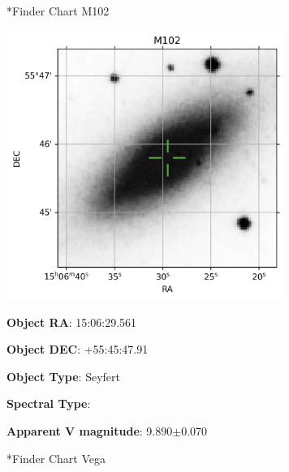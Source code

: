 \documentclass[12pt,preprintnumbers,amsmath,amssymb,nofootinbib,superscriptaddress]{revtex4-1}
\begin{document}
\newpage

*{Finder Chart M102}\label{Ueff}

\begin{minipage}{0.6\textwidth}
    \includegraphics[width=9cm]{./example_output/finder_M102.jpg}
\vspace{-2cm}

\end{minipage}
\begin{minipage}{0.3\textwidth}

\textbf{Object RA}: 15:06:29.561

\textbf{Object DEC}: +55:45:47.91

\textbf{Object Type}: Seyfert

\textbf{Spectral Type}: 

\textbf{Apparent V magnitude}: 9.890$\pm$0.070

\end{minipage}

\newpage

*{Finder Chart Vega}\label{Ueff}
\end{document}
